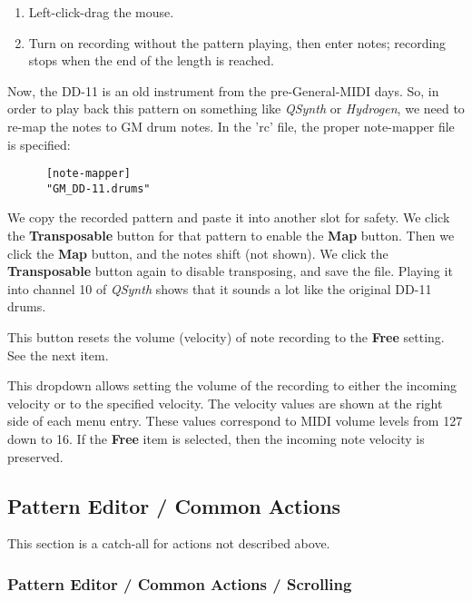    \begin{enumerate}
      \item Left-click-drag the mouse.
      \item Turn on recording without the pattern playing, then
         enter notes; recording stops when the end of the length is reached.
   \end{enumerate}

   Now, the DD-11 is an old instrument from the pre-General-MIDI days.
   So, in order to play back this pattern on something like
   \textsl{QSynth} or \textsl{Hydrogen}, we need to re-map the notes to GM drum
   notes.  In the 'rc' file, the proper note-mapper file is specified:

   \begin{verbatim}
      [note-mapper]
      "GM_DD-11.drums"
   \end{verbatim}

   We copy the recorded pattern and paste it into another slot for safety.
   We click the \textbf{Transposable} button for that pattern to enable the
   \textbf{Map} button.  Then we click the \textbf{Map} button, and the notes
   shift (not shown).  
   We click the \textbf{Transposable} button again to disable transposing,
   and save the file.
   Playing it into channel 10 of \textsl{QSynth} shows that it sounds a lot
   like the original DD-11 drums.

   This button resets the volume (velocity)
   of note recording to the \textbf{Free} setting.
   See the next item.

   This dropdown allows setting the volume of the recording to either the
   incoming velocity or to the specified velocity.
   The velocity values are shown at the right side of each menu entry.
   These values correspond to MIDI volume levels from 127 down to 16.
   If the \textbf{Free} item is selected, then the incoming note velocity is
   preserved.

\subsection{Pattern Editor / Common Actions}
\label{subsec:pattern_editor_common}

   This section is a catch-all for actions not described above.

\subsubsection{Pattern Editor / Common Actions / Scrolling}
\label{subsec:pattern_editor_scrolling}

